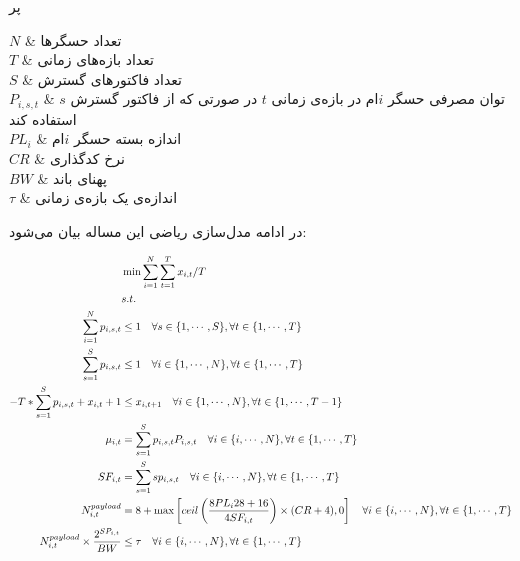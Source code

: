 ‌پر

$N$ & تعداد حسگرها \\

$T$ & تعداد بازه‌های زمانی \\

$S$ & تعداد فاکتورهای گسترش \\

$P_{i, s, t}$ & توان مصرفی حسگر $i$ام در بازه‌ی زمانی $t$ در صورتی که از فاکتور گسترش $s$ استفاده کند \\

$PL_{i}$ & اندازه بسته حسگر $i$ام \\

$CR$ & نرخ کدگذاری \\

$BW$ & پهنای باند \\

$\tau$ & اندازه‌ی یک بازه‌ی زمانی \\



در ادامه مدل‌سازی ریاضی این مساله بیان می‌شود:

\begin{align}
  &\min \sum_{i = 1}^{N} \sum_{t = 1}^{T} x_{i, t} / T \\
  &s.t. \notag \\
  \sum_{i = 1}^{N} p_{i, s, t} &\le 1 \quad \forall s \in \{1, \cdots, S\}, \forall t \in \{1, \cdots, T\} \label{eq:constr_subchannel_limit} \\
  \sum_{s = 1}^{S} p_{i, s, t} &\le 1 \quad \forall i \in \{1, \cdots, N\}, \forall t \in \{1, \cdots, T\} \label{eq:constr_thing_limit} \\
  -T * \sum_{s = 1}^{S} p_{i, s, t} + x_{i, t} + 1 &\le x_{i, t + 1} \quad \forall i \in \{1, \cdots, N\}, \forall t \in \{1, \cdots, T - 1\} \label{eq:constr_aoi_limit} \\
  \mu_{i, t} &= \sum_{s = 1}^{S} p_{i, s, t} P_{i, s, t}  \quad \forall i \in \{i, \cdots, N\}, \forall t \in \{1, \cdots, T\} \label{eq:constr_power_range} \\
  SF_{i, t} &= \sum_{s = 1}^{S} s p_{i, s, t} \quad \forall i \in \{i, \cdots, N\}, \forall t \in \{1, \cdots, T\} \label{eq:constr_set_sp} \\
  N^{payload}_{i, t} &= 8 + \max\left[ ceil \left( \frac{8 PL_{i} 28 + 16}{4 SF_{i, t}} \right) \times (CR + 4), 0 \right]
                       \quad \forall i \in \{i, \cdots, N\}, \forall t \in \{1, \cdots, T\}
                       \label{eq:constr_payload} \\
  N^{payload}_{i, t} \times \frac{2^{SP_{i, t}}}{BW} &\le \tau \quad \forall i \in \{i, \cdots, N\}, \forall t \in \{1, \cdots, T\}
                                                       \label{eq:constr_time_slot_threshold} \\
\end{align}

